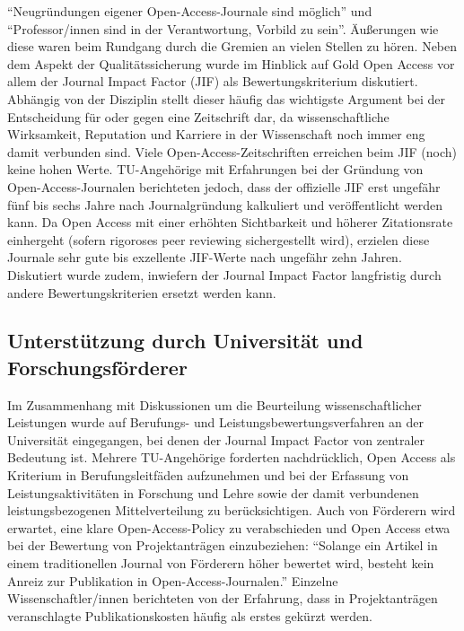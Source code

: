 \documentclass[a4paper,
fontsize=11pt,
oneside,
numbers=noperiodatend,
parskip=half-,
bibliography=totoc,
final
]{scrartcl}
\begin{document}
\enquote{Neugründungen eigener Open-Access-Journale sind möglich} und
\enquote{Professor/innen sind in der Verantwortung, Vorbild zu sein}.
Äußerungen wie diese waren beim Rundgang durch die Gremien an vielen
Stellen zu hören. Neben dem Aspekt der Qualitätssicherung wurde im
Hinblick auf Gold Open Access vor allem der Journal Impact Factor (JIF)
als Bewertungskriterium diskutiert. Abhängig von der Disziplin stellt
dieser häufig das wichtigste Argument bei der Entscheidung für oder
gegen eine Zeitschrift dar, da wissenschaftliche Wirksamkeit, Reputation
und Karriere in der Wissenschaft noch immer eng damit verbunden sind.
Viele Open-Access-Zeit\-schrif\-ten erreichen beim JIF (noch) keine hohen
Werte. TU-Angehörige mit Erfahrungen bei der Gründung von
Open-Access-Journalen berichteten jedoch, dass der offizielle JIF erst
ungefähr fünf bis sechs Jahre nach Journalgründung kalkuliert und
veröffentlicht werden kann. Da Open Access mit einer erhöhten
Sichtbarkeit und höherer Zitationsrate einhergeht (sofern rigoroses peer
reviewing sichergestellt wird), erzielen diese Journale sehr gute bis
exzellente JIF-Werte nach ungefähr zehn Jahren. Diskutiert wurde zudem,
inwiefern der Journal Impact Factor langfristig durch andere
Bewertungskriterien ersetzt werden kann.

\hypertarget{unterstuxfctzung-durch-universituxe4t-und-forschungsfuxf6rderer}{%
\subsection*{Unterstützung durch Universität und
Forschungsförderer}\label{unterstuxfctzung-durch-universituxe4t-und-forschungsfuxf6rderer}}

Im Zusammenhang mit Diskussionen um die Beurteilung wissenschaftlicher
Leistungen wurde auf Berufungs- und Leistungsbewertungsverfahren an der
Universität eingegangen, bei denen der Journal Impact Factor von
zentraler Bedeutung ist. Mehrere TU-Angehörige forderten nachdrücklich,
Open Access als Kriterium in Berufungsleitfäden aufzunehmen und bei der
Erfassung von Leistungsaktivitäten in Forschung und Lehre sowie der
damit verbundenen leistungsbezogenen Mittelverteilung zu
berücksichtigen. Auch von Förderern wird erwartet, eine klare
Open-Access-Policy zu verabschieden und Open Access etwa bei der
Bewertung von Projektanträgen einzubeziehen: \enquote{Solange ein
Artikel in einem traditionellen Journal von Förderern höher bewertet
wird, besteht kein Anreiz zur Publikation in Open-Access-Journalen.}
Einzelne Wissenschaftler/innen berichteten von der Erfahrung, dass in
Projektanträgen veranschlagte Publikationskosten häufig als erstes
gekürzt werden.
\end{document}
